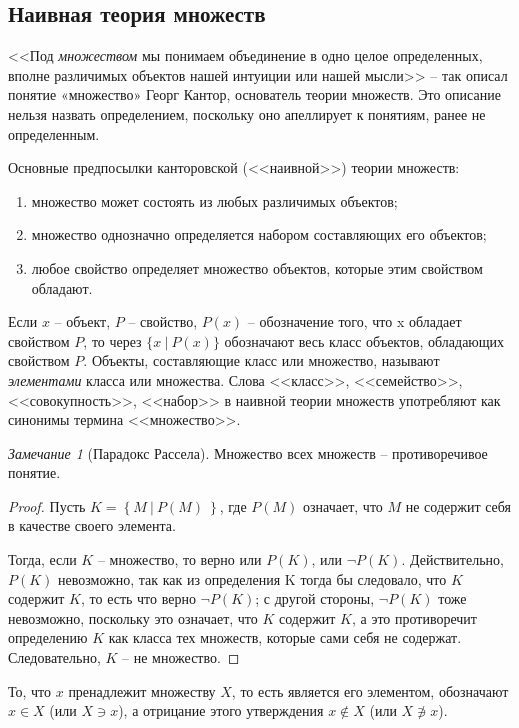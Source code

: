 \documentclass[14pt, a4paper]{article}
\theoremstyle{definition}
\theoremstyle{remark}
\newtheorem*{remark}{Замечание}
\newenvironment{oenum}%
{\begin{enumerate}[label=\arabic*$^\circ$]}{\end{enumerate}}
\begin{document}
\subsection{Наивная теория множеств}
<<Под \textit{множеством} мы понимаем объединение в одно целое определенных, вполне различимых объектов нашей интуиции или нашей мысли>> -- так описал понятие «множество» Георг Кантор, основатель теории множеств. Это описание нельзя назвать определением, поскольку оно апеллирует к понятиям, ранее не определенным.


Основные предпосылки канторовской (<<наивной>>) теории множеств:
\begin{oenum}
    \item множество может состоять из любых различимых объектов;
    \item множество однозначно определяется набором составляющих его объектов;
    \item любое свойство определяет множество объектов, которые этим свойством обладают.
\end{oenum}

Если $x$ -- объект, $P$ -- свойство, $P(x)$ -- обозначение того, что x обладает свойством $P$, то через $\{ x\ \vert\ P(x) \}$ обозначают весь класс объектов, обладающих свойством $P$.
Объекты, составляющие класс или множество, называют \textit{элементами} класса или множества. Слова <<класс>>, <<семейство>>, <<совокупность>>, <<набор>> в наивной теории
множеств употребляют как синонимы термина <<множество>>.

\begin{remark}[Парадокс Рассела]
Множество всех множеств -- противоречивое понятие.
\end{remark}
\begin{proof}
Пусть $K = \left\{M  \  \vert \ P(M) \ \right\}$, где $P(M)$ означает, что $M$ не содержит себя в качестве своего элемента.

Тогда, если $K$ -- множество, то верно или $P(K)$, или $\neg P(K)$.
Действительно, $P(K)$ невозможно, так как из определения K тогда бы следовало, что $K$ содержит $K$, то есть что верно $\neg P(K)$; с другой стороны, $\neg P(K)$ тоже невозможно, поскольку это означает,
что $K$ содержит $K$, а это противоречит определению $K$ как класса тех множеств, которые сами себя не содержат.
Следовательно, $K$ -- не множество.
\end{proof}
То, что $x$ пренадлежит множеству $X$, то есть является его элементом, обозначают $x \in X$ (или $X \ni x$), а отрицание этого утверждения $x \notin X$ (или $X \not \ni x$).
\end{document}
